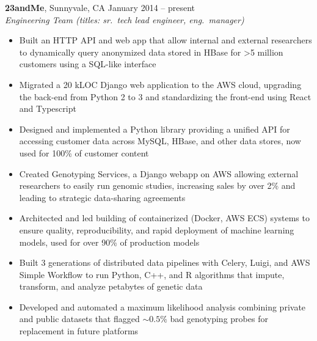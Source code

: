 \documentclass[margin,line]{resume}
\begin{document}
\begin{resume}
    \textbf{23andMe}, Sunnyvale, CA \hfill\vspace{1mm}\hfill January 2014 -- present\\%
    \textsl{Engineering Team (titles: sr.\ tech lead engineer, eng.\ manager)}
    \begin{itemize}
    \item Built an HTTP API and web app that allow internal and external researchers to dynamically query anonymized data stored in HBase for \textgreater 5 million customers using a SQL-like interface
    \item Migrated a 20 kLOC Django web application to the AWS cloud, upgrading the back-end from Python 2 to 3 and standardizing the front-end using React and Typescript
    \item Designed and implemented a Python library providing a unified API for accessing customer data across MySQL, HBase, and other data stores, now used for 100\% of customer content
    \item Created Genotyping Services, a Django webapp on AWS allowing external researchers to easily run genomic studies, increasing sales by over 2\% and leading to strategic data-sharing agreements
    \item Architected and led building of containerized (Docker, AWS ECS) systems to ensure quality, reproducibility, and rapid deployment of machine learning models, used for over 90\% of production models
    \item Built 3 generations of distributed data pipelines with Celery, Luigi, and AWS Simple Workflow to run Python, C++, and R algorithms that impute, transform, and analyze petabytes of genetic data
    \item Developed and automated a maximum likelihood analysis combining private and public datasets that flagged \(\sim0.5\%\) bad genotyping probes for replacement in future platforms
    \end{itemize}

\end{resume}
\end{document}
